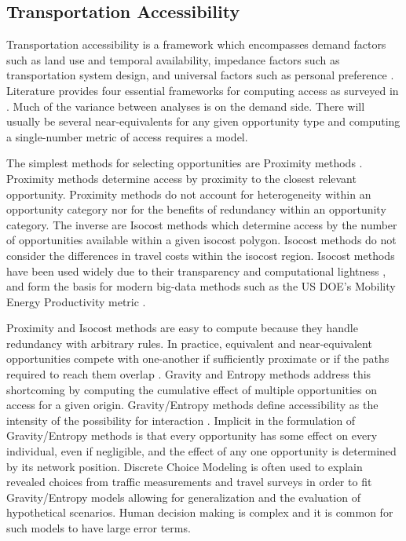 \subsection*{Transportation Accessibility}

Transportation accessibility is a framework which encompasses demand factors such as land use and temporal availability, impedance factors such as transportation system design, and universal factors such as personal preference \cite{Geurs_2004}. Literature provides four essential frameworks for computing access as surveyed in \cite{Handy_1997, Kwan_1998, Geurs_2004, Miller_2018, Handy_2020}. Much of the variance between analyses is on the demand side. There will usually be several near-equivalents for any given opportunity type and computing a single-number metric of access requires a model.

The simplest methods for selecting opportunities are Proximity methods \cite{Wachs_1973, Vickerman_1974}. Proximity methods determine access by proximity to the closest relevant opportunity. Proximity methods do not account for heterogeneity within an opportunity category nor for the benefits of redundancy within an opportunity category. The inverse are Isocost methods which determine access by the number of opportunities available within a given isocost polygon. Isocost methods do not consider the differences in travel costs within the isocost region. Isocost methods have been used widely due to their transparency and computational lightness \cite{Easa_1993}, and form the basis for modern big-data methods such as the US DOE's Mobility Energy Productivity metric \cite{Hou_2019}.

Proximity and Isocost methods are easy to compute because they handle redundancy with arbitrary rules. In practice, equivalent and near-equivalent opportunities compete with one-another if sufficiently proximate or if the paths required to reach them overlap \cite{Stouffer_1940}. Gravity and Entropy methods \cite{Noulas_2012, Jung_2008} address this shortcoming by computing the cumulative effect of multiple opportunities on access for a given origin. Gravity/Entropy methods define accessibility as the intensity of the possibility for interaction \cite{Hansen_1959}. Implicit in the formulation of Gravity/Entropy methods is that every opportunity has some effect on every individual, even if negligible, and the effect of any one opportunity is determined by its network position. Discrete Choice Modeling \cite{Ben_Akiva_1985} is often used to explain revealed choices from traffic measurements and travel surveys \cite{Cevero_1995, Shen_1998, Karst_2003} in order to fit Gravity/Entropy models allowing for generalization and the evaluation of hypothetical scenarios. Human decision making is complex and it is common for such models to have large error terms.

